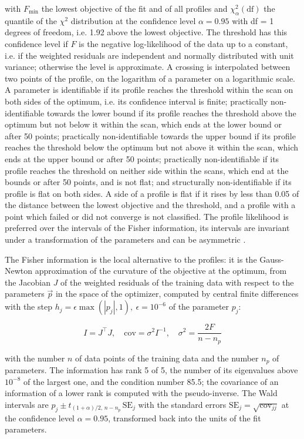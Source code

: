 \documentclass{article}
\begin{document}
with $F_{\min}$ the lowest objective of the fit and of all profiles and $\chi^2_{\alpha}(\mathrm{df})$ the quantile of the $\chi^2$ distribution at the confidence level $\alpha = 0.95$ with df = 1 degrees of freedom, i.e. 1.92 above the lowest objective. The threshold has this confidence level if $F$ is the negative log-likelihood of the data up to a constant, i.e. if the weighted residuals are independent and normally distributed with unit variance; otherwise the level is approximate. A crossing is interpolated between two points of the profile, on the logarithm of a parameter on a logarithmic scale. A parameter is identifiable if its profile reaches the threshold within the scan on both sides of the optimum, i.e. its confidence interval is finite; practically non-identifiable towards the lower bound if its profile reaches the threshold above the optimum but not below it within the scan, which ends at the lower bound or after 50 points; practically non-identifiable towards the upper bound if its profile reaches the threshold below the optimum but not above it within the scan, which ends at the upper bound or after 50 points; practically non-identifiable if its profile reaches the threshold on neither side within the scans, which end at the bounds or after 50 points, and is not flat; and structurally non-identifiable if its profile is flat on both sides. A side of a profile is flat if it rises by less than 0.05 of the distance between the lowest objective and the threshold, and a profile with a point which failed or did not converge is not classified. The profile likelihood is preferred over the intervals of the Fisher information, its intervals are invariant under a transformation of the parameters and can be asymmetric \cite{Wieland2021}.

The Fisher information is the local alternative to the profiles: it is the Gauss-Newton approximation of the curvature of the objective at the optimum, from the Jacobian $J$ of the weighted residuals of the training data with respect to the parameters $\vec{p}$ in the space of the optimizer, computed by central finite differences with the step $h_j = \epsilon \max(|p_j|, 1),\ \epsilon = 10^{-6}$ of the parameter $p_j$:

\begin{equation}
I = J^\top J, \quad \mathrm{cov} = \sigma^2 I^{-1}, \quad \sigma^2 = \frac{2 F}{n - n_p}
\end{equation}

with the number $n$ of data points of the training data and the number $n_p$ of parameters. The information has rank 5 of 5, the number of its eigenvalues above $10^{-8}$ of the largest one, and the condition number 85.5; the covariance of an information of a lower rank is computed with the pseudo-inverse. The Wald intervals are $\hat{p}_j \pm t_{(1+\alpha)/2,\, n-n_p}\, \mathrm{SE}_j$ with the standard errors $\mathrm{SE}_j = \sqrt{\mathrm{cov}_{jj}}$ at the confidence level $\alpha = 0.95$, transformed back into the units of the fit parameters.
\end{document}
